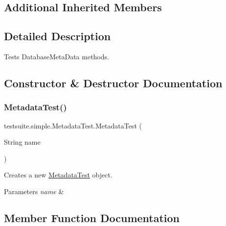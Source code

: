 \subsection*{Additional Inherited Members}


\subsection{Detailed Description}
Tests Database\+Meta\+Data methods. 

\subsection{Constructor \& Destructor Documentation}
\mbox{\label{classtestsuite_1_1simple_1_1_metadata_test_a215f8f5f715ab9a78e98b5c48299c240}} 
\subsubsection{\texorpdfstring{Metadata\+Test()}{MetadataTest()}}
{\footnotesize\ttfamily testsuite.\+simple.\+Metadata\+Test.\+Metadata\+Test (\begin{DoxyParamCaption}\item[{String}]{name }\end{DoxyParamCaption})}

Creates a new \mbox{\hyperlink{classtestsuite_1_1simple_1_1_metadata_test}{Metadata\+Test}} object.


\begin{DoxyParams}{Parameters}
{\em name} & \\
\hline
\end{DoxyParams}


\subsection{Member Function Documentation}
\mbox{\label{classtestsuite_1_1simple_1_1_metadata_test_a8a06af1a7d28478dbe8d0b9ec2146908}} 
